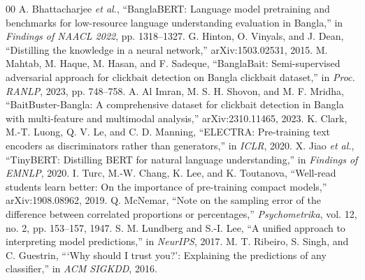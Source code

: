 \documentclass[conference]{IEEEtran}
\begin{document}
\begin{thebibliography}{00}
 A. Bhattacharjee \emph{et al.}, ``BanglaBERT: Language model pretraining and benchmarks for low-resource language understanding evaluation in Bangla,'' in \emph{Findings of NAACL 2022}, pp. 1318--1327.
 G. Hinton, O. Vinyals, and J. Dean, ``Distilling the knowledge in a neural network,'' arXiv:1503.02531, 2015.
 M. Mahtab, M. Haque, M. Hasan, and F. Sadeque, ``BanglaBait: Semi-supervised adversarial approach for clickbait detection on Bangla clickbait dataset,'' in \emph{Proc. RANLP}, 2023, pp. 748--758.
 A. Al Imran, M. S. H. Shovon, and M. F. Mridha, ``BaitBuster-Bangla: A comprehensive dataset for clickbait detection in Bangla with multi-feature and multimodal analysis,'' arXiv:2310.11465, 2023.
 K. Clark, M.-T. Luong, Q. V. Le, and C. D. Manning, ``ELECTRA: Pre-training text encoders as discriminators rather than generators,'' in \emph{ICLR}, 2020.
 X. Jiao \emph{et al.}, ``TinyBERT: Distilling BERT for natural language understanding,'' in \emph{Findings of EMNLP}, 2020.
 I. Turc, M.-W. Chang, K. Lee, and K. Toutanova, ``Well-read students learn better: On the importance of pre-training compact models,'' arXiv:1908.08962, 2019.
 Q. McNemar, ``Note on the sampling error of the difference between correlated proportions or percentages,'' \emph{Psychometrika}, vol. 12, no. 2, pp. 153--157, 1947.
 S. M. Lundberg and S.-I. Lee, ``A unified approach to interpreting model predictions,'' in \emph{NeurIPS}, 2017.
 M. T. Ribeiro, S. Singh, and C. Guestrin, ```Why should I trust you?': Explaining the predictions of any classifier,'' in \emph{ACM SIGKDD}, 2016.
\end{thebibliography}
\end{document}
